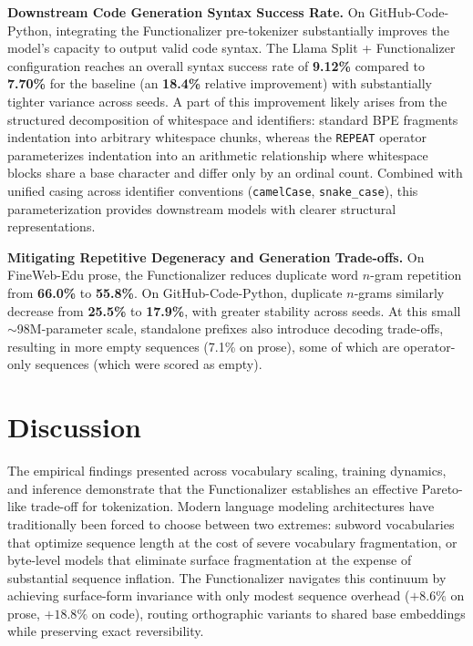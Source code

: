 \documentclass{article}
\begin{document}
\textbf{Downstream Code Generation Syntax Success Rate.} On GitHub-Code-Python, integrating the Functionalizer pre-tokenizer substantially improves the model's capacity to output valid code syntax. The Llama Split + Functionalizer configuration reaches an overall syntax success rate of \textbf{9.12\%} compared to \textbf{7.70\%} for the baseline (an \textbf{18.4\%} relative improvement) with substantially tighter variance across seeds. A part of this improvement likely arises from the structured decomposition of whitespace and identifiers: standard BPE fragments indentation into arbitrary whitespace chunks, whereas the \texttt{REPEAT} operator parameterizes indentation into an arithmetic relationship where whitespace blocks share a base character and differ only by an ordinal count. Combined with unified casing across identifier conventions (\texttt{camelCase}, \texttt{snake\_case}), this parameterization provides downstream models with clearer structural representations.

\textbf{Mitigating Repetitive Degeneracy and Generation Trade-offs.} On FineWeb-Edu prose, the Functionalizer reduces duplicate word $n$-gram repetition from \textbf{66.0\%} to \textbf{55.8\%}. On GitHub-Code-Python, duplicate $n$-grams similarly decrease from \textbf{25.5\%} to \textbf{17.9\%}, with greater stability across seeds. At this small $\sim$98M-parameter scale, standalone prefixes also introduce decoding trade-offs, resulting in more empty sequences (7.1\% on prose), some of which are operator-only sequences (which were scored as empty).

\section{Discussion}\label{sec:discussion}

The empirical findings presented across vocabulary scaling, training dynamics, and inference demonstrate that the Functionalizer establishes an effective Pareto-like trade-off for tokenization. Modern language modeling architectures have traditionally been forced to choose between two extremes: subword vocabularies that optimize sequence length at the cost of severe vocabulary fragmentation, or byte-level models that eliminate surface fragmentation at the expense of substantial sequence inflation. The Functionalizer navigates this continuum by achieving surface-form invariance with only modest sequence overhead ($+8.6\%$ on prose, $+18.8\%$ on code), routing orthographic variants to shared base embeddings while preserving exact reversibility.
\end{document}
